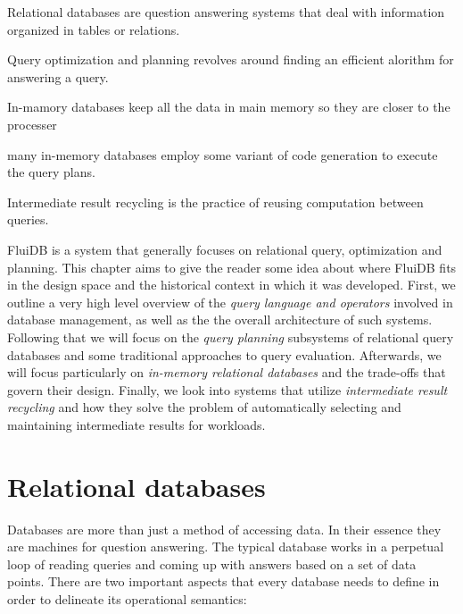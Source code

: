 
\begin{summary}
\item Relational databases are question answering systems that deal
  with information organized in tables or relations.
\item Query optimization and planning revolves around finding an
  efficient alorithm for answering a query.
\item In-mamory databases keep all the data in main memory so they are
  closer to the processer
\item many in-memory databases employ some variant of code generation
  to execute the query plans.
\item Intermediate result recycling is the practice of reusing
  computation between queries.
\end{summary}

FluiDB is a system that generally focuses on relational query,
optimization and planning. This chapter aims to give the reader some
idea about where FluiDB fits in the design space and the historical
context in which it was developed.  First, we outline a very high
level overview of the \emph{query language and operators} involved in
database management, as well as the the overall architecture of such
systems. Following that we will focus on the \emph{query planning}
subsystems of relational query databases and some traditional
approaches to query evaluation. Afterwards, we will focus particularly
on \emph{in-memory relational databases} and the trade-offs that
govern their design. Finally, we look into systems that utilize
\emph{intermediate result recycling} and how they solve the problem of
automatically selecting and maintaining intermediate results for
workloads.

\section{Relational databases}

Databases are more than just a method of accessing data. In their
essence they are machines for question answering. The typical database
works in a perpetual loop of reading queries and coming up with
answers based on a set of data points. There are two important aspects
that every database needs to define in order to delineate its
operational semantics:

